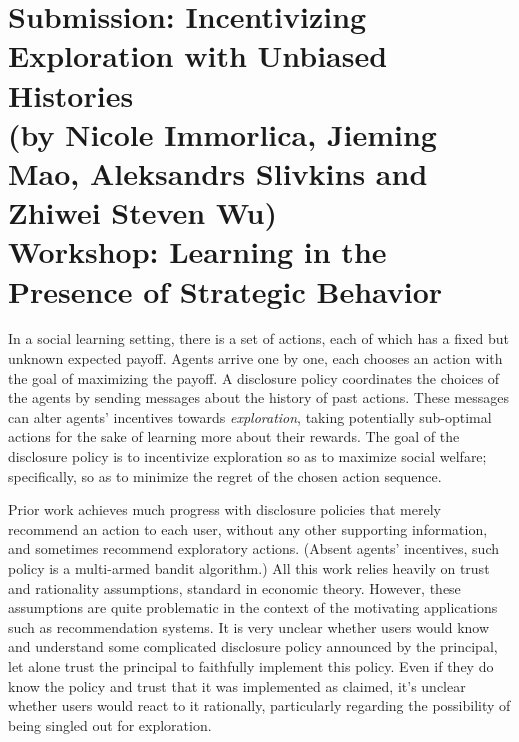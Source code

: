 \documentclass[11pt,letterpaper]{article}
\begin{document}

\section*{Submission: Incentivizing Exploration with Unbiased Histories \\
{\large (by Nicole Immorlica, Jieming Mao, Aleksandrs Slivkins and Zhiwei Steven Wu)}\\
{\large Workshop: Learning in the Presence of Strategic Behavior}
}


In a social learning setting, there is a set of actions, each of which has a fixed but unknown expected payoff. Agents arrive one by one, each chooses an action with the goal of maximizing the payoff.  A disclosure policy coordinates the choices of the agents by sending messages about the history of past actions. These messages can alter agents' incentives towards \emph{exploration}, taking potentially sub-optimal actions for the sake of learning more about their rewards. The goal of the disclosure policy is to incentivize exploration so as  to maximize social welfare; specifically, so as to minimize the regret of the chosen action sequence.

Prior work achieves much progress with disclosure policies that merely recommend an action to each user, without any other supporting information, and sometimes recommend exploratory actions. (Absent agents' incentives, such policy is a multi-armed bandit algorithm.) All this work relies heavily on trust and rationality assumptions, standard in economic theory. However, these assumptions are quite problematic in the context of the motivating applications such as recommendation systems. It is very unclear whether users would know and understand some complicated disclosure policy announced  by the principal, let alone trust the principal to faithfully implement this policy. Even if they do know the policy and trust that it was implemented as claimed, it's unclear whether users would react to it rationally, particularly regarding the possibility of being singled out for exploration.
\end{document}
